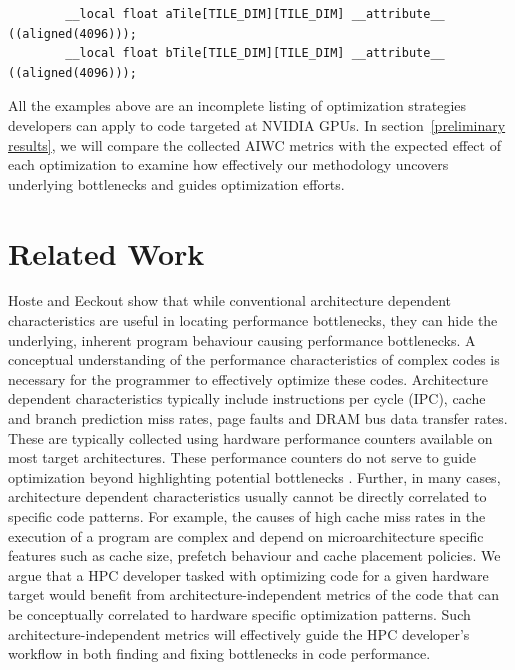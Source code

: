 \documentclass[review=false, sigchi]{acmart}
\begin{document}
	\begin{lstlisting}
		__local float aTile[TILE_DIM][TILE_DIM] __attribute__ ((aligned(4096)));
		__local float bTile[TILE_DIM][TILE_DIM] __attribute__ ((aligned(4096)));
	\end{lstlisting}
	
	All the examples above are an incomplete listing of optimization strategies developers can apply to code targeted at NVIDIA GPUs.
	In section~\ref{preliminary results}, we will compare the collected AIWC metrics with the expected effect of each optimization to examine how effectively our methodology uncovers underlying bottlenecks and guides optimization efforts.
	
	\flushbottom
	\section{Related Work} \label{related work}
	
	Hoste and Eeckout \cite{hoste2007microarchitecture} show that while conventional architecture dependent characteristics are useful in locating performance bottlenecks, they can hide the underlying, inherent program behaviour causing performance bottlenecks. A conceptual understanding of the performance characteristics of complex codes is necessary for the programmer to effectively optimize these codes. Architecture dependent characteristics typically include instructions per cycle (IPC), cache and branch prediction miss rates, page faults and DRAM bus data transfer rates. These are typically collected using hardware performance counters available on most target architectures. These performance counters do not serve to guide optimization beyond highlighting potential bottlenecks \cite{hoste2007microarchitecture, ganesan2008performance}. Further, in many cases, architecture dependent characteristics usually cannot be directly correlated to specific code patterns.
	For example, the causes of high cache miss rates in the execution of a program are complex and depend on microarchitecture specific features such as cache size, prefetch behaviour and cache placement policies.
	We argue that a HPC developer tasked with optimizing code for a given hardware target would benefit from architecture-independent metrics of the code that can be conceptually correlated to hardware specific optimization patterns. Such architecture-independent metrics will effectively guide the HPC developer's workflow in both finding and fixing bottlenecks in code performance.
	
\end{document}
